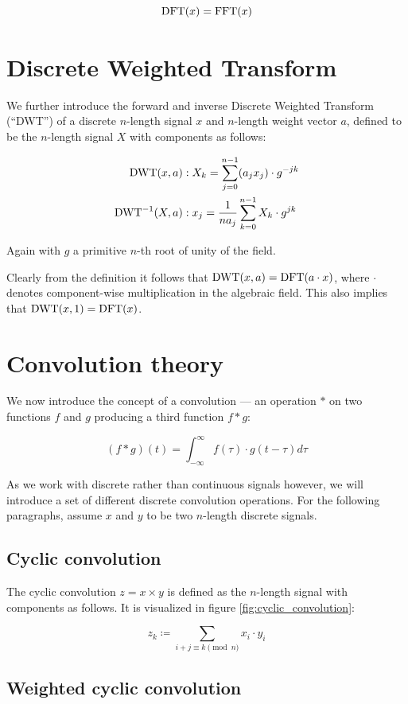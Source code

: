 \[
		\operatorname{DFT}(x) = \operatorname{FFT}(x)
\]

\section{Discrete Weighted Transform}

We further introduce the forward and inverse Discrete Weighted Transform
(``DWT'') of a discrete $n$-length signal $x$ and $n$-length weight vector $a$,
defined to be the $n$-length signal $X$ with components as follows:

\begin{align*}
		\operatorname{DWT}(x, a) & : X_k = \sum_{j=0}^{n-1} (a_j x_j) \cdot g^{-jk} \\
		\operatorname{DWT}^{-1}(X, a) & : x_j = \frac{1}{n a_j} \sum_{k=0}^{n-1} X_k \cdot g^{jk}
\end{align*}

Again with $g$ a primitive $n$-th root of unity of the field.

Clearly from the definition it follows that $\operatorname{DWT}(x, a) = \operatorname{DFT}(a \cdot x)$,
where $\cdot$ denotes component-wise multiplication in the algebraic field.
This also implies that $\operatorname{DWT}(x, 1) = \operatorname{DFT}(x)$.

\section{Convolution theory}

We now introduce the concept of a convolution --- an operation $*$ on two
functions $f$ and $g$ producing a third function $f * g$:

\[
		(f * g)(t) = \int_{-\infty}^{\infty} f(\tau) \cdot g(t - \tau) d\tau
\]

As we work with discrete rather than continuous signals however, we will
introduce a set of different discrete convolution operations. For the following
paragraphs, assume $x$ and $y$ to be two $n$-length discrete signals.

\subsection{Cyclic convolution}

The cyclic convolution $z = x \times y$ is defined as the $n$-length signal
with components as follows. It is visualized in figure
\ref{fig:cyclic_convolution}:

\[
		z_k \coloneqq \sum_{i + j \equiv k \pmod{n}} x_i \cdot y_i
\]

\subsection{Weighted cyclic convolution}


